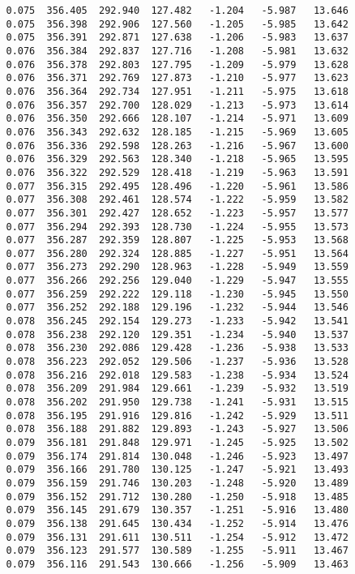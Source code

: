 \begin{verbatim}
   0.075  356.405  292.940  127.482   -1.204   -5.987   13.646
   0.075  356.398  292.906  127.560   -1.205   -5.985   13.642
   0.075  356.391  292.871  127.638   -1.206   -5.983   13.637
   0.076  356.384  292.837  127.716   -1.208   -5.981   13.632
   0.076  356.378  292.803  127.795   -1.209   -5.979   13.628
   0.076  356.371  292.769  127.873   -1.210   -5.977   13.623
   0.076  356.364  292.734  127.951   -1.211   -5.975   13.618
   0.076  356.357  292.700  128.029   -1.213   -5.973   13.614
   0.076  356.350  292.666  128.107   -1.214   -5.971   13.609
   0.076  356.343  292.632  128.185   -1.215   -5.969   13.605
   0.076  356.336  292.598  128.263   -1.216   -5.967   13.600
   0.076  356.329  292.563  128.340   -1.218   -5.965   13.595
   0.076  356.322  292.529  128.418   -1.219   -5.963   13.591
   0.077  356.315  292.495  128.496   -1.220   -5.961   13.586
   0.077  356.308  292.461  128.574   -1.222   -5.959   13.582
   0.077  356.301  292.427  128.652   -1.223   -5.957   13.577
   0.077  356.294  292.393  128.730   -1.224   -5.955   13.573
   0.077  356.287  292.359  128.807   -1.225   -5.953   13.568
   0.077  356.280  292.324  128.885   -1.227   -5.951   13.564
   0.077  356.273  292.290  128.963   -1.228   -5.949   13.559
   0.077  356.266  292.256  129.040   -1.229   -5.947   13.555
   0.077  356.259  292.222  129.118   -1.230   -5.945   13.550
   0.077  356.252  292.188  129.196   -1.232   -5.944   13.546
   0.078  356.245  292.154  129.273   -1.233   -5.942   13.541
   0.078  356.238  292.120  129.351   -1.234   -5.940   13.537
   0.078  356.230  292.086  129.428   -1.236   -5.938   13.533
   0.078  356.223  292.052  129.506   -1.237   -5.936   13.528
   0.078  356.216  292.018  129.583   -1.238   -5.934   13.524
   0.078  356.209  291.984  129.661   -1.239   -5.932   13.519
   0.078  356.202  291.950  129.738   -1.241   -5.931   13.515
   0.078  356.195  291.916  129.816   -1.242   -5.929   13.511
   0.078  356.188  291.882  129.893   -1.243   -5.927   13.506
   0.079  356.181  291.848  129.971   -1.245   -5.925   13.502
   0.079  356.174  291.814  130.048   -1.246   -5.923   13.497
   0.079  356.166  291.780  130.125   -1.247   -5.921   13.493
   0.079  356.159  291.746  130.203   -1.248   -5.920   13.489
   0.079  356.152  291.712  130.280   -1.250   -5.918   13.485
   0.079  356.145  291.679  130.357   -1.251   -5.916   13.480
   0.079  356.138  291.645  130.434   -1.252   -5.914   13.476
   0.079  356.131  291.611  130.511   -1.254   -5.912   13.472
   0.079  356.123  291.577  130.589   -1.255   -5.911   13.467
   0.079  356.116  291.543  130.666   -1.256   -5.909   13.463

\end{verbatim}
